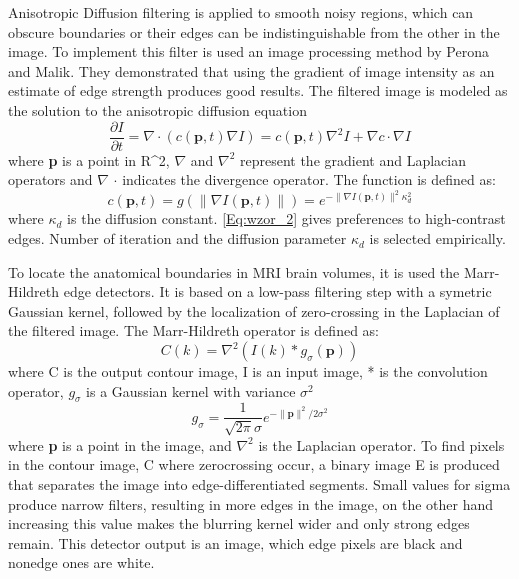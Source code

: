 Anisotropic Diffusion filtering is applied to smooth noisy regions, which can obscure boundaries or their edges can be indistinguishable from the other in the image. To implement this filter is used an image processing method by Perona and Malik. They demonstrated that using the gradient of image intensity as an estimate of edge strength produces good results. The filtered image is modeled as the solution to the anisotropic diffusion equation
\begin{equation}
    \frac{\partial I}{\partial t} = \nabla \cdot (c(\textbf{p},t)\nabla I) = c(\textbf{p},t)\nabla^{2}I + \nabla c \cdot \nabla I  \label{Eq:wzor_1}
\end{equation}
where \textbf{p} is a point in R^2, $\nabla$ and $\nabla^{2}$  represent the gradient and Laplacian operators and $\nabla$ $\cdot$ indicates the divergence operator. The function is defined as:
\begin{equation}
    c(\textbf{p},t) = g(\parallel\nabla I(\boldsymbol{p},t)\parallel) = e^{-\parallel\nabla I(\textbf{p},t)\parallel^{2} \kappa^{2}_{d}} \label{Eq:wzor_2}
\end{equation}
where $\kappa_{d}$ is the diffusion constant. \eqref{Eq:wzor_2} gives preferences to high-contrast edges. Number of iteration and the diffusion parameter $\kappa_{d}$ is selected empirically.

To locate the anatomical boundaries in MRI brain volumes, it is used the Marr-Hildreth edge detectors. It is based on a low-pass filtering step with a symetric Gaussian kernel, followed by the localization of zero-crossing in the Laplacian of the filtered image. The Marr-Hildreth operator is defined as:
\begin{equation}
    C(k) = \nabla^{2}(I(k)*g_{\sigma}(\textbf{p})) \label{Eq:wzor_3}
\end{equation}
where C is the output contour image, I is an input image, * is the convolution operator, $g_{\sigma}$ is a Gaussian kernel with variance $\sigma^{2}$
\begin{equation}
    g_{\sigma} = \frac{1}{\sqrt{2\pi}\sigma}e^{- \parallel\textbf{p}\parallel^{2}/2\sigma^{2}} \label{Eq:wzor_4}
\end{equation}
where \textbf{p} is a point in the image, and $\nabla^{2}$ is the Laplacian operator.
To find pixels in the contour image, C where zerocrossing occur, a binary image E is produced that separates the image into edge-differentiated segments. Small values for sigma produce narrow filters, resulting in more edges in the image, on the other hand increasing this value makes the blurring kernel wider and only strong edges remain. This detector output is an image, which edge pixels are black and nonedge ones are white.


